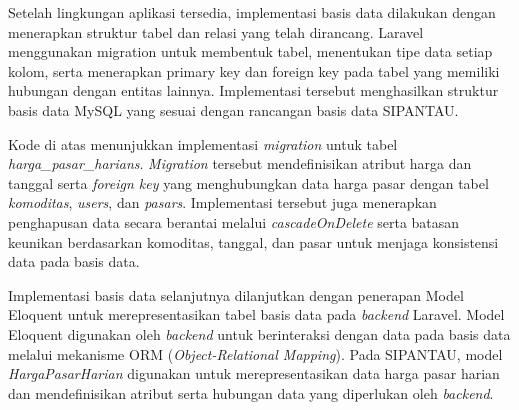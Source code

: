 Setelah lingkungan aplikasi tersedia, implementasi basis data dilakukan dengan menerapkan struktur tabel dan relasi yang telah dirancang. Laravel menggunakan migration untuk membentuk tabel, menentukan tipe data setiap kolom, serta menerapkan primary key dan foreign key pada tabel yang memiliki hubungan dengan entitas lainnya. Implementasi tersebut menghasilkan struktur basis data MySQL yang sesuai dengan rancangan basis data SIPANTAU.

\begin{code}
\end{code}

Kode di atas menunjukkan implementasi \textit{migration} untuk tabel \textit{harga\allowbreak\_pasar\allowbreak\_harians}. \textit{Migration} tersebut mendefinisikan atribut harga dan tanggal serta \textit{foreign key} yang menghubungkan data harga pasar dengan tabel \textit{komoditas}, \textit{users}, dan \textit{pasars}. Implementasi tersebut juga menerapkan penghapusan data secara berantai melalui \textit{cascadeOnDelete} serta batasan keunikan berdasarkan komoditas, tanggal, dan pasar untuk menjaga konsistensi data pada basis data.

Implementasi basis data selanjutnya dilanjutkan dengan penerapan Model Eloquent untuk merepresentasikan tabel basis data pada \textit{backend} Laravel. Model Eloquent digunakan oleh \textit{backend} untuk berinteraksi dengan data pada basis data melalui mekanisme ORM (\textit{Object-Relational Mapping}). Pada SIPANTAU, model \textit{HargaPasarHarian} digunakan untuk merepresentasikan data harga pasar harian dan mendefinisikan atribut serta hubungan data yang diperlukan oleh \textit{backend}.

